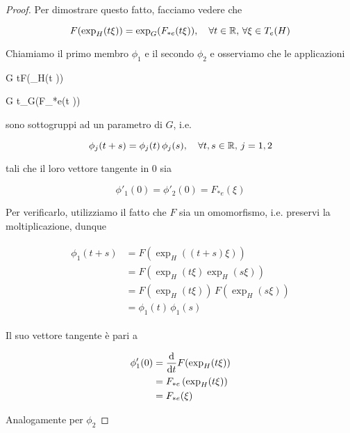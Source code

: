 \begin{proof}
	Per dimostrare questo fatto, facciamo vedere che
	
	\begin{equation}
		F(\exp_{H}(t \xi)) = \exp_{G}(F_{*e}(t \xi)) \qcomma \forall t \in \R, \, \forall \xi \in T_{e}(H)
	\end{equation}

	Chiamiamo il primo membro $ \phi_{1} $ e il secondo $ \phi_{2} $ e osserviamo che le applicazioni
	
		{\R}{G}%
		{t}{F(\exp_{H}(t \xi))}
		
		{\R}{G}%
		{t}{\exp_{G}(F_{*e}(t \xi))}
		
	sono sottogruppi ad un parametro di $ G $, i.e.
	
	\begin{equation}
		\phi_{j}(t+s) = \phi_{j}(t) \, \phi_{j}(s) \qcomma \forall t,s \in \R, \, j = 1,2
	\end{equation}
	
	tali che il loro vettore tangente in $ 0 $ sia
	
	\begin{equation}
		\phi'_{1}(0) = \phi'_{2}(0) = F_{*e}(\xi)
	\end{equation}

	Per verificarlo, utilizziamo il fatto che $ F $ sia un omomorfismo, i.e. preservi la moltiplicazione, dunque
	
	\begin{align}
		\begin{split}
			\phi_{1}(t+s) &= F(\exp_{H}((t+s) \xi))\\
			&= F(\exp_{H}(t \xi) \exp_{H}(s \xi))\\
			&= F(\exp_{H}(t \xi)) \, F(\exp_{H}(s \xi))\\
			&= \phi_{1}(t) \, \phi_{1}(s)
		\end{split}
	\end{align}

	Il suo vettore tangente è pari a
	
	\begin{align}
		\begin{split}
			\phi'_{1}(0) &= \dv{t} F(\exp_{H}(t \xi))\\
			&= F_{*e} \left( \exp_{H}(t \xi) \right)\\
			&= F_{*e}(\xi)
		\end{split}
	\end{align}

	Analogamente per $ \phi_{2} $
	

\end{proof}
